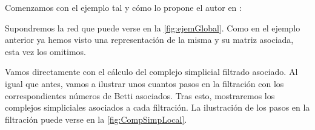 \documentclass[12pt, a4paper, twoside]{book}
\numberwithin{equation}{section}
\theoremstyle{definition}
\newenvironment{ejem}
  {\pushQED{\qed}\renewcommand{\qedsymbol}{$\blacktriangleleft$}\ejemplo}
  {\popQED\endejemplo}
\theoremstyle{remark}
\theoremstyle{plain}
\begin{document}
	Comenzamos con el ejemplo tal y cómo lo propone el autor en 
	\cite{Articulo-Watanabe}:
	
	\begin{ejem}
		Supondremos la red que puede verse en 
		la \autoref{fig:ejemGlobal}. Como en el ejemplo 
		anterior ya hemos visto una representación de la misma y su 
		matriz asociada, esta vez los omitimos.

		Vamos directamente con el cálculo del complejo simplicial 
		filtrado asociado. Al igual que antes, vamos a ilustrar unos 
		cuantos pasos en la filtración con los correspondientes 
		números de Betti asociados. Tras esto, mostraremos los 
		complejos simpliciales asociados a cada filtración. La 
		ilustración de los pasos en la filtración puede verse en 
		la \autoref{fig:CompSimpLocal}.

		\begin{figure}[!htbp]
\end{figure}
\end{ejem}
\end{document}
